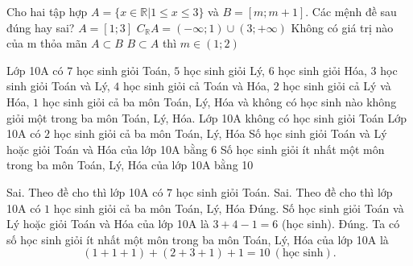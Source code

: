 \begin{ex}%
	Cho hai tập hợp $A=\{x \in \mathbb{R} \left| 1 \leq x \leq 3\right.\}$ và $B=[m ; m+1]$. Các mệnh đề sau đúng hay sai?
	\choiceTF
	{\True $A=[1 ; 3]$}
	{\True $C_{\mathbb{R}} A=(-\infty ; 1) \cup(3 ;+\infty)$}
	{\True Không có giá trị nào của m thỏa mãn $A \subset B$}
	{$B \subset A$ thì $m \in(1 ; 2)$}
\end{ex}
\begin{ex}%
	Lớp 10A có $7$ học sinh giỏi Toán, $5$ học sinh giỏi Lý, $6$ học sinh giỏi Hóa, $3$ học sinh giỏi Toán và Lý, $4$ học sinh giỏi cả Toán và Hóa, $2$ học sinh giỏi cả Lý và Hóa, $1$ học sinh giỏi cả ba môn Toán, Lý, Hóa và không có học sinh nào không giỏi một trong ba môn Toán, Lý, Hóa.
	\choiceTF
	{Lớp 10A không có học sinh giỏi Toán}
	{Lớp 10A có $2$ học sinh giỏi cả ba môn Toán, Lý, Hóa}
	{\True Số học sinh giỏi Toán và Lý hoặc giỏi Toán và Hóa của lớp 10A bằng $6$}
	{\True Số học sinh giỏi ít nhất một môn trong ba môn Toán, Lý, Hóa của lớp 10A bằng 10}
	\loigiai
	{%
		\begin{itemchoice}
			\itemch Sai. Theo đề cho thì lớp 10A có $7$ học sinh giỏi Toán.
			\itemch Sai. Theo đề cho thì lớp 10A có $1$ học sinh giỏi cả ba môn Toán, Lý, Hóa
			\itemch Đúng. Số học sinh giỏi Toán và Lý hoặc giỏi Toán và Hóa của lớp 10A là $3+4-1=6$ (học sinh).
			\itemch Đúng. Ta có số học sinh giỏi ít nhất một môn trong ba môn Toán, Lý, Hóa của lớp 10A là
			$$(1+1+1)+(2+3+1)+1=10\ (\text{học sinh}).$$
		\end{itemchoice}
	}
\end{ex}
